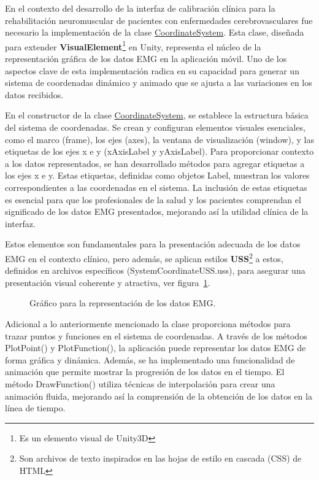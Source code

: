 En el contexto del desarrollo de la interfaz de calibración clínica para la rehabilitación neuromuscular de pacientes con enfermedades cerebrovasculares fue necesario la implementación de la clase \underline{CoordinateSystem}. Esta clase, diseñada para extender \textbf{VisualElement}\footnote{Es un elemento visual de Unity3D} en Unity, representa el núcleo de la representación gráfica de los datos EMG en la aplicación móvil. Uno de los aspectos clave de esta implementación radica en su capacidad para generar un sistema de coordenadas dinámico y animado que se ajusta a las variaciones en los datos recibidos.

En el constructor de la clase \underline{CoordinateSystem}, se establece la estructura básica del sistema de coordenadas. Se crean y configuran elementos visuales esenciales, como el marco (frame), los ejes (axes), la ventana de visualización (window), y las etiquetas de los ejes x e y (xAxisLabel y yAxisLabel). Para proporcionar contexto a los datos representados, se han desarrollado métodos para agregar etiquetas a los ejes x e y. Estas etiquetas, definidas como objetos Label, muestran los valores correspondientes a las coordenadas en el sistema. La inclusión de estas etiquetas es esencial para que los profesionales de la salud y los pacientes comprendan el significado de los datos EMG presentados, mejorando así la utilidad clínica de la interfaz. 
    
Estos elementos son fundamentales para la presentación adecuada de los datos EMG en el contexto clínico, pero además, se aplican estilos \textbf{USS}\footnote{Son archivos de texto inspirados en las hojas de estilo en cascada (CSS) de HTML} a estos, definidos en archivos específicos (SystemCoordinateUSS.uss), para asegurar una presentación visual coherente y atractiva, ver figura~\ref{fig: graph-emg}.

\begin{figure}[!ht]
    \centering
    \caption{Gráfico para la representación de los datos EMG.}
    \label{fig: graph-emg}
\end{figure}

\newpage
Adicional a lo anteriormente mencionado la clase proporciona métodos para trazar puntos y funciones en el sistema de coordenadas. A través de los métodos PlotPoint() y PlotFunction(), la aplicación puede representar los datos EMG de forma gráfica y dinámica. Además, se ha implementado una funcionalidad de animación que permite mostrar la progresión de los datos en el tiempo. El método DrawFunction() utiliza técnicas de interpolación para crear una animación fluida, mejorando así la comprensión de la obtención de los datos en la línea de tiempo.
